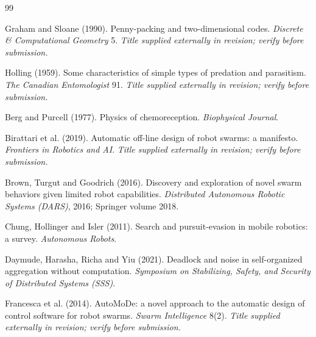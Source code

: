 \documentclass[11pt,a4paper]{article}
\begin{document}
\clearpage


\begin{thebibliography}{99}

Graham and Sloane (1990).
\newblock Penny-packing and two-dimensional codes.
\newblock \emph{Discrete \& Computational Geometry} 5.
\newblock \textit{Title supplied externally in revision; verify before submission.}

Holling (1959).
\newblock Some characteristics of simple types of predation and parasitism.
\newblock \emph{The Canadian Entomologist} 91.
\newblock \textit{Title supplied externally in revision; verify before submission.}

Berg and Purcell (1977).
\newblock Physics of chemoreception.
\newblock \emph{Biophysical Journal}.

Birattari et al. (2019).
\newblock Automatic off-line design of robot swarms: a manifesto.
\newblock \emph{Frontiers in Robotics and AI}.
\newblock \textit{Title supplied externally in revision; verify before submission.}

Brown, Turgut and Goodrich (2016).
\newblock Discovery and exploration of novel swarm behaviors given limited robot
capabilities.
\newblock \emph{Distributed Autonomous Robotic Systems (DARS)}, 2016; Springer
volume 2018.

Chung, Hollinger and Isler (2011).
\newblock Search and pursuit-evasion in mobile robotics: a survey.
\newblock \emph{Autonomous Robots}.

Daymude, Harasha, Richa and Yiu (2021).
\newblock Deadlock and noise in self-organized aggregation without computation.
\newblock \emph{Symposium on Stabilizing, Safety, and Security of Distributed
Systems (SSS)}.

Francesca et al. (2014).
\newblock AutoMoDe: a novel approach to the automatic design of control software
for robot swarms.
\newblock \emph{Swarm Intelligence} 8(2).
\newblock \textit{Title supplied externally in revision; verify before submission.}


\end{thebibliography}
\end{document}
